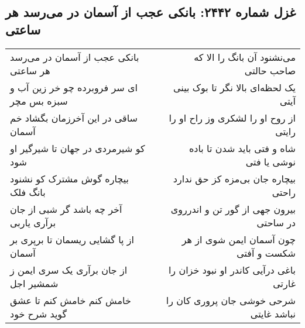 \begin{center}
\section*{غزل شماره ۲۴۴۲: بانکی عجب از آسمان در می‌رسد هر ساعتی}
\label{sec:2442}
\begin{longtable}{l p{0.5cm} r}
بانکی عجب از آسمان در می‌رسد هر ساعتی
&&
می‌نشنود آن بانگ را الا که صاحب حالتی
\\
ای سر فروبرده چو خر زین آب و سبزه بس مچر
&&
یک لحظه‌ای بالا نگر تا بوک بینی آیتی
\\
ساقی در این آخرزمان بگشاد خم آسمان
&&
از روح او را لشکری وز راح او را رایتی
\\
کو شیرمردی در جهان تا شیرگیر او شود
&&
شاه و فتی باید شدن تا باده نوشی یا فتی
\\
بیچاره گوش مشترک کو نشنود بانگ فلک
&&
بیچاره جان بی‌مزه کز حق ندارد راحتی
\\
آخر چه باشد گر شبی از جان برآری یاربی
&&
بیرون جهی از گور تن و اندرروی در ساحتی
\\
از پا گشایی ریسمان تا برپری بر آسمان
&&
چون آسمان ایمن شوی از هر شکست و آفتی
\\
از جان برآری یک سری ایمن ز شمشیر اجل
&&
باغی درآیی کاندر او نبود خزان را غارتی
\\
خامش کنم خامش کنم تا عشق گوید شرح خود
&&
شرحی خوشی جان پروری کان را نباشد غایتی
\\
\end{longtable}
\end{center}
